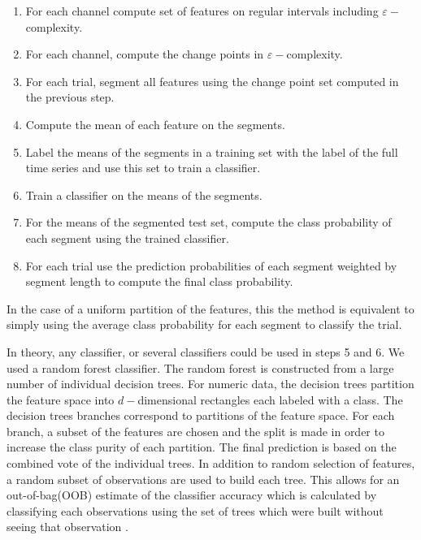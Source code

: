 \begin{enumerate}
  \item For each channel compute set of features
        on regular intervals including 
        $\varepsilon-$complexity.
  \item For each channel, compute the change points 
        in $\varepsilon-$complexity. 
  \item For each trial, segment all features using the change point 
        set computed in the previous step. 
  \item Compute the mean of each feature on the 
        segments. 
   \item Label the means of the segments 
         in a training 
         set with the label of the full time 
         series and use this set to train 
         a classifier.
   \item Train a classifier on the means of the 
         segments. 
  \item  For the means of the segmented test set,
         compute the class probability of each 
       segment using the trained 
         classifier. 
  \item  For each trial use the prediction probabilities of each segment weighted by segment length to compute the final class probability.
\end{enumerate} \label{alg:segment-alg}

In the case of a uniform partition of the features, this
the method is equivalent to simply using the average class probability for each segment to classify the trial.

In theory, any classifier, or several classifiers could be used in steps 5 and 6. We used a random forest classifier. The random forest is constructed from a large number of individual decision trees. For numeric data, the decision trees partition the feature space into $d-$dimensional rectangles each labeled with a class. The decision trees branches correspond to partitions of the feature space. For each branch, a subset of the features are chosen and the split is made in order to increase the class purity of each partition. The final prediction is based on the combined vote of the individual trees.  In addition to random selection of features, a random subset of observations are used to build each tree. This allows for an out-of-bag(OOB) estimate of the classifier 
accuracy which is calculated by classifying each observations using the set of trees which were built without seeing that observation \cite{breiman2001}.

